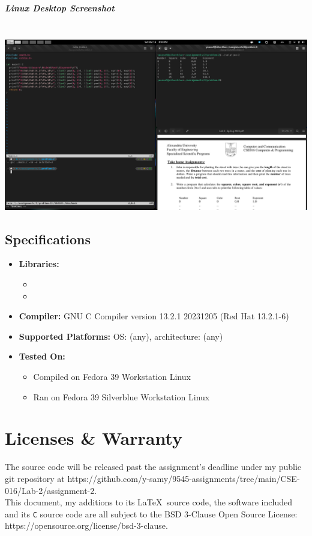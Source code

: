 \documentclass[a4paper,11pt]{article}
\theoremstyle{mytheor}
\theoremstyle{mytheor}
\begin{document}
\subparagraph{Linux Desktop Screenshot\\\\}
\includegraphics[width=1\linewidth,center]{desktop-2.png}
\newpage
\subsection{Specifications}
\begin{itemize}
    \item \textbf{Libraries:}
    \begin{itemize}
        \item \texttt{\color{inlinecode}{stdio.h}}
        \item \texttt{\color{inlinecode}{math.h}} 
    \end{itemize}
    \item \textbf{Compiler:} GNU C Compiler \texttt{\color{inlinecode}{(gcc)}} version 13.2.1 20231205 (Red Hat 13.2.1-6)
    \item \textbf{Supported Platforms:} OS: (any), architecture: (any)
    \item \textbf{Tested On:}
    \begin{itemize}
        \item Compiled on Fedora 39 Workstation Linux
        \item Ran on Fedora 39 Silverblue Workstation Linux
    \end{itemize}
\end{itemize}
\section{Licenses \& Warranty}
The source code will be released past the assignment's deadline under my public git repository at https://github.com/y-samy/9545-assignments/tree/main/CSE-016/Lab-2/assignment-2.\\
This document, my additions to its \LaTeX \ source code, the software included and its \texttt{C} source code are all subject to the BSD 3-Clause Open Source License:\\https://opensource.org/license/bsd-3-clause.\\
\end{document}
